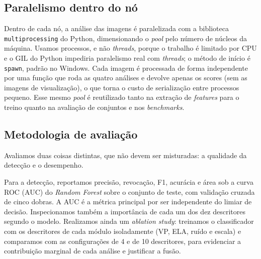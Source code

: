 \documentclass[12pt]{article}
\begin{document}
\subsection{Paralelismo dentro do nó}

Dentro de cada nó, a análise das imagens é paralelizada com a biblioteca
\texttt{multiprocessing} do Python, dimensionando o \textit{pool} pelo número de
núcleos da máquina. Usamos processos, e não \textit{threads}, porque o trabalho é
limitado por CPU e o GIL do Python impediria paralelismo real com
\textit{threads}; o método de início é \texttt{spawn}, padrão no Windows. Cada
imagem é processada de forma independente por uma função que roda as quatro
análises e devolve apenas os scores (sem as imagens de visualização), o que torna
o custo de serialização entre processos pequeno. Esse mesmo \textit{pool} é
reutilizado tanto na extração de \textit{features} para o treino quanto na
avaliação de conjuntos e nos \textit{benchmarks}.

\subsection{Metodologia de avaliação}

Avaliamos duas coisas distintas, que não devem ser misturadas: a qualidade da
detecção e o desempenho.

Para a detecção, reportamos precisão, revocação, F1, acurácia e área sob a curva
ROC (AUC) do \textit{Random Forest} sobre o conjunto de teste, com validação
cruzada de cinco dobras. A AUC é a métrica principal por ser independente do
limiar de decisão. Inspecionamos também a importância de cada um dos dez
descritores segundo o modelo. Realizamos ainda um \textit{ablation study}:
treinamos o classificador com os descritores de cada módulo isoladamente (VP,
ELA, ruído e escala) e comparamos com as configurações de 4 e de 10 descritores,
para evidenciar a contribuição marginal de cada análise e justificar a fusão.
\end{document}

